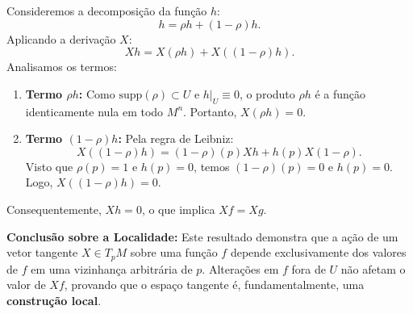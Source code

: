 {	Consideremos a decomposição da função $h$:
	\begin{equation*}
		h = \rho h + (1 - \rho) h.
	\end{equation*}
	Aplicando a derivação $X$:
	\begin{equation*}
		X h = X(\rho h) + X((1 - \rho) h).
	\end{equation*}
	Analisamos os termos:
	\begin{enumerate}
		\item \textbf{Termo $\rho h$:} Como $\text{supp}(\rho) \subset U$ e $h|_U \equiv 0$, o produto $\rho h$ é a função identicamente nula em todo $M^n$. Portanto, $X(\rho h) = 0$.
		\item \textbf{Termo $(1 - \rho) h$:} Pela regra de Leibniz:
		\begin{equation*}
			X((1 - \rho) h) = (1 - \rho)(p) X h + h(p) X(1 - \rho).
		\end{equation*}
		Visto que $\rho(p) = 1$ e $h(p) = 0$, temos $(1 - \rho)(p) = 0$ e $h(p) = 0$. Logo, $X((1 - \rho) h) = 0$.
	\end{enumerate}
	Consequentemente, $X h = 0$, o que implica $X f = X g$.
	
	\textbf{Conclusão sobre a Localidade:}
	Este resultado demonstra que a ação de um vetor tangente $X \in T_p M$ sobre uma função $f$ depende exclusivamente dos valores de $f$ em uma vizinhança arbitrária de $p$. Alterações em $f$ fora de $U$ não afetam o valor de $X f$, provando que o espaço tangente é, fundamentalmente, uma \textbf{construção local}.
}
